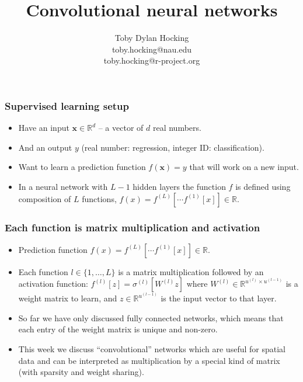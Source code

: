 \documentclass{beamer}
\begin{document}
\title{Convolutional neural networks}

\author{
  Toby Dylan Hocking\\
  toby.hocking@nau.edu\\
  toby.hocking@r-project.org\\
}

\maketitle


\begin{frame}
  \frametitle{Supervised learning setup}
  \begin{itemize}
  \item Have an input $\mathbf x\in\mathbb R^d$ -- a vector of $d$
    real numbers.
  \item And an output $y$ (real number: regression, integer ID:
    classification).
  \item Want to learn a prediction function $f(\mathbf x) = y$ that
    will work on a new input.
  \item In a neural network with $L-1$ hidden layers the function $f$
    is defined using composition of $L$ functions,
    $f(x)=f^{(L)}[\cdots f^{(1)}[x] ]\in\mathbb R$.
  \end{itemize}
\end{frame}

\begin{frame}
  \frametitle{Each function is matrix multiplication and activation}
  \begin{itemize}
  \item Prediction function $f(x)=f^{(L)}[\cdots f^{(1)}[x] ]\in\mathbb R$.
  \item Each function $l\in\{1,\dots, L\}$ is a matrix multiplication
    followed by an activation function:
    $f^{(l)}[z] = \sigma^{(l)}[ W^{(l)} z ]$ where
    $W^{(l)}\in\mathbb R^{u^{(l)}\times u^{(l-1)}}$ is a weight matrix
    to learn, and $z\in\mathbb R^{u^{(l-1)}}$ is the input vector to
    that layer.
  \item So far we have only discussed fully connected networks, which
    means that each entry of the weight matrix is unique and non-zero.
  \item This week we discuss ``convolutional'' networks which are
    useful for spatial data and can be interpreted as multiplication
    by a special kind of matrix (with sparsity and weight sharing).
\end{itemize}
\end{frame}
\end{document}
